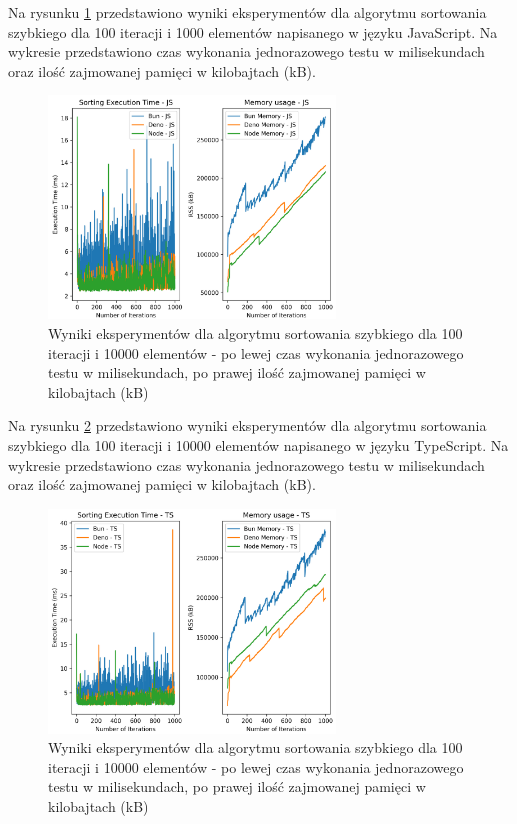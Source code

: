 Na rysunku \ref{fig:quick_sorting_e4} przedstawiono wyniki eksperymentów dla algorytmu sortowania szybkiego dla 100 iteracji i 1000 elementów napisanego w języku JavaScript. Na wykresie przedstawiono czas wykonania jednorazowego testu w milisekundach oraz ilość zajmowanej pamięci w kilobajtach (kB).

\begin{figure}[H]
  \centering
  \includegraphics[width=0.68\textwidth]{Figures/sorting/sorting_quick_1000_10000_js.png}
  \caption{Wyniki eksperymentów dla algorytmu sortowania szybkiego dla 100 iteracji i 10000 elementów - po lewej czas wykonania jednorazowego testu w milisekundach, po prawej ilość zajmowanej pamięci w kilobajtach (kB)}
  \label{fig:quick_sorting_e4}
\end{figure}

Na rysunku \ref{fig:quick_sorting_e4_ts} przedstawiono wyniki eksperymentów dla algorytmu sortowania szybkiego dla 100 iteracji i 10000 elementów napisanego w języku TypeScript. Na wykresie przedstawiono czas wykonania jednorazowego testu w milisekundach oraz ilość zajmowanej pamięci w kilobajtach (kB).

\begin{figure}[H]
  \centering
  \includegraphics[width=0.68\textwidth]{Figures/sorting/sorting_quick_1000_10000_ts.png}
  \caption{Wyniki eksperymentów dla algorytmu sortowania szybkiego dla 100 iteracji i 10000 elementów - po lewej czas wykonania jednorazowego testu w milisekundach, po prawej ilość zajmowanej pamięci w kilobajtach (kB)}
  \label{fig:quick_sorting_e4_ts}
\end{figure}

